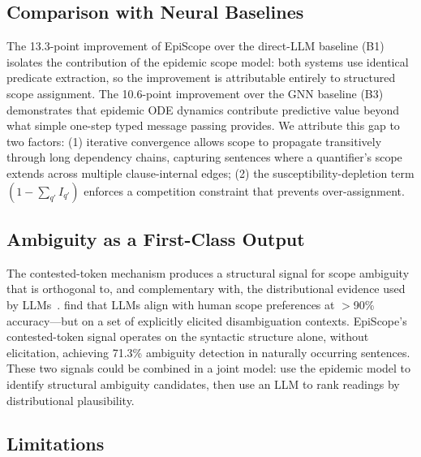 \documentclass[11pt,letterpaper]{article}
\begin{document}
\subsection{Comparison with Neural Baselines}

The 13.3-point improvement of EpiScope over the direct-LLM baseline (B1) isolates the contribution of the
epidemic scope model: both systems use identical predicate extraction, so the improvement is attributable
entirely to structured scope assignment. The 10.6-point improvement over the GNN baseline (B3) demonstrates
that epidemic ODE dynamics contribute predictive value beyond what simple one-step typed message passing
provides. We attribute this gap to two factors: (1) iterative convergence allows scope to propagate
transitively through long dependency chains, capturing sentences where a quantifier's scope extends across
multiple clause-internal edges; (2) the susceptibility-depletion term $\left(1 - \sum_{q'} I_{q'}\right)$
enforces a competition constraint that prevents over-assignment.

\subsection{Ambiguity as a First-Class Output}

The contested-token mechanism produces a structural signal for scope ambiguity that is orthogonal to, and
complementary with, the distributional evidence used by LLMs~\citep{Kamath2024}. \citet{Kamath2024} find that
LLMs align with human scope preferences at $>$90\% accuracy---but on a set of explicitly elicited
disambiguation contexts. EpiScope's contested-token signal operates on the syntactic structure alone, without
elicitation, achieving 71.3\% ambiguity detection in naturally occurring sentences. These two signals could be
combined in a joint model: use the epidemic model to identify structural ambiguity candidates, then use an LLM
to rank readings by distributional plausibility.

\subsection{Limitations}
\end{document}
